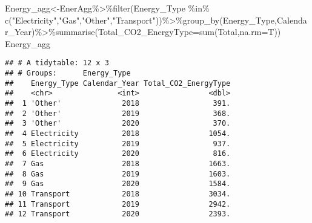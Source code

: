 \documentclass[
]{article}
\newenvironment{Shaded}{\begin{snugshade}}{\end{snugshade}}
\newcommand{\AttributeTok}[1]{\textcolor[rgb]{0.77,0.63,0.00}{#1}}
\newcommand{\FunctionTok}[1]{\textcolor[rgb]{0.00,0.00,0.00}{#1}}
\newcommand{\NormalTok}[1]{#1}
\newcommand{\OtherTok}[1]{\textcolor[rgb]{0.56,0.35,0.01}{#1}}
\newcommand{\SpecialCharTok}[1]{\textcolor[rgb]{0.00,0.00,0.00}{#1}}
\newcommand{\StringTok}[1]{\textcolor[rgb]{0.31,0.60,0.02}{#1}}
\begin{document}
\begin{Shaded}
\begin{Highlighting}[]
\NormalTok{Energy\_agg}\OtherTok{\textless{}{-}}\NormalTok{EnerAgg}\SpecialCharTok{\%\textgreater{}\%}\FunctionTok{filter}\NormalTok{(Energy\_Type }\SpecialCharTok{\%in\%} \FunctionTok{c}\NormalTok{(}\StringTok{"Electricity"}\NormalTok{,}\StringTok{"Gas"}\NormalTok{,}\StringTok{"\textquotesingle{}Other\textquotesingle{}"}\NormalTok{,}\StringTok{"Transport"}\NormalTok{))}\SpecialCharTok{\%\textgreater{}\%}\FunctionTok{group\_by}\NormalTok{(Energy\_Type,Calendar\_Year)}\SpecialCharTok{\%\textgreater{}\%}\FunctionTok{summarise}\NormalTok{(}\AttributeTok{Total\_CO2\_EnergyType=}\FunctionTok{sum}\NormalTok{(Total,}\AttributeTok{na.rm=}\NormalTok{T))}
\NormalTok{Energy\_agg}
\end{Highlighting}
\end{Shaded}

\begin{verbatim}
## # A tidytable: 12 x 3
## # Groups:      Energy_Type
##    Energy_Type Calendar_Year Total_CO2_EnergyType
##    <chr>               <int>                <dbl>
##  1 'Other'              2018                 391.
##  2 'Other'              2019                 368.
##  3 'Other'              2020                 370.
##  4 Electricity          2018                1054.
##  5 Electricity          2019                 937.
##  6 Electricity          2020                 816.
##  7 Gas                  2018                1663.
##  8 Gas                  2019                1603.
##  9 Gas                  2020                1584.
## 10 Transport            2018                3034.
## 11 Transport            2019                2942.
## 12 Transport            2020                2393.
\end{verbatim}
\end{document}
